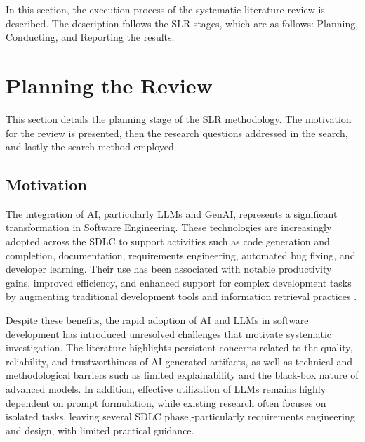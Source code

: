 \label{chap:slr}

In this section, the execution process of the systematic literature review is described. The description follows
the SLR stages, which are as follows: Planning, Conducting, and Reporting the results.

\section{Planning the Review}

This section details the planning stage of the SLR methodology. The motivation for the review is presented, then
the research questions addressed in the search, and lastly the search method employed.

\subsection{Motivation}

The integration of AI, particularly LLMs and GenAI, represents a significant transformation in Software Engineering. These technologies are increasingly adopted across the SDLC to support activities such as code generation and completion, documentation, requirements engineering, automated bug fixing, and developer learning. Their use has been associated with notable productivity gains, improved efficiency, and enhanced support for complex development tasks by augmenting traditional development tools and information retrieval practices \cite{Ahmed:2025ai, Zhang:2025ea, Durrani:2024ad, Jabrw:2025ss, Banh:2025cf, Farhanna:2025eu, KarlovsKarlovskis:2024ga, Terragni:2025fa}.

Despite these benefits, the rapid adoption of AI and LLMs in software development has introduced unresolved challenges that motivate systematic investigation. The literature highlights persistent concerns related to the quality, reliability, and trustworthiness of AI-generated artifacts, as well as technical and methodological barriers such as limited explainability and the black-box nature of advanced models. In addition, effective utilization of LLMs remains highly dependent on prompt formulation, while existing research often focuses on isolated tasks, leaving several SDLC phase,-particularly requirements engineering and design, with limited practical guidance.

